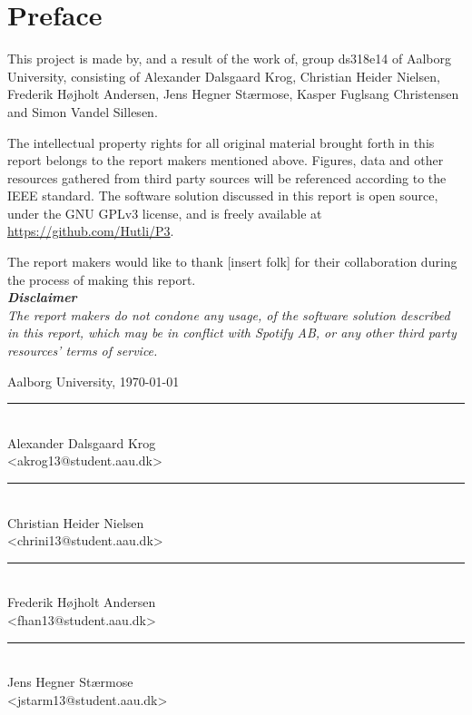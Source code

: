 \chapter*{Preface}\label{ch:preface}
 \thispagestyle{empty}
This project is made by, and a result of the work of, group ds318e14 of Aalborg University, consisting of Alexander Dalsgaard Krog, Christian Heider Nielsen, Frederik Højholt Andersen, Jens Hegner Stærmose, Kasper Fuglsang Christensen and Simon Vandel Sillesen.

The intellectual property rights for all original material brought forth in this report belongs to the report makers mentioned above. Figures, data and other resources gathered from third party sources will be referenced according to the IEEE standard. The software solution discussed in this report is open source, under the GNU GPLv3 license, and is freely available at \url{https://github.com/Hutli/P3}.

The report makers would like to thank [insert folk] for their collaboration during the process of making this report.\\

\noindent
\textit{
\textbf{Disclaimer}\\
The report makers do not condone any usage, of the software solution described in this report, which may be in conflict with Spotify AB, or any other third party resources' terms of service.}

\vspace{\baselineskip}\hfill Aalborg University, \today
\vfill

\noindent
\begin{minipage}[b]{0.45\textwidth}
 \centering
 \rule{\textwidth}{0.5pt}\\
  Alexander Dalsgaard Krog\\
 {\footnotesize <akrog13@student.aau.dk>}
\end{minipage}
\hfill
\begin{minipage}[b]{0.45\textwidth}
 \centering
 \rule{\textwidth}{0.5pt}\\
  Christian Heider Nielsen\\
 {\footnotesize <chrini13@student.aau.dk>}
\end{minipage}
\vspace{3\baselineskip}

\noindent
\begin{minipage}[b]{0.45\textwidth}
 \centering
 \rule{\textwidth}{0.5pt}\\
  Frederik Højholt Andersen\\
 {\footnotesize <fhan13@student.aau.dk>}
\end{minipage}
\hfill
\begin{minipage}[b]{0.45\textwidth}
 \centering
 \rule{\textwidth}{0.5pt}\\
  Jens Hegner Stærmose\\
 {\footnotesize <jstarm13@student.aau.dk>}
\end{minipage}
\vspace{3\baselineskip}

